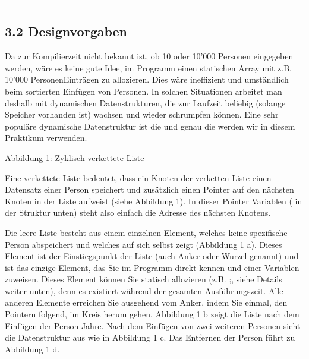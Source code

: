 \documentclass[a4paper,10pt,english]{report}
\begin{document}
\bigskip\hrule\bigskip



\subsection{3.2	Designvorgaben}
\label{\detokenize{P06_Personen_Verwaltung_Linked_List/README:designvorgaben}}
\sphinxAtStartPar
{}
Da zur Kompilierzeit nicht bekannt ist, ob 10 oder 10’000 Personen eingegeben werden, wäre es keine gute Idee, im Programm einen statischen Array mit z.B. 10’000 Personen\sphinxhyphen{}Einträgen zu allozieren. Dies wäre ineffizient und umständlich beim sortierten Einfügen von Personen. In solchen Situationen arbeitet man deshalb mit dynamischen Datenstrukturen, die zur Laufzeit beliebig (solange Speicher vorhanden ist) wachsen und wieder schrumpfen können. Eine sehr populäre dynamische Datenstruktur ist die  und genau die werden wir in diesem Praktikum verwenden.

\sphinxAtStartPar
{}

\sphinxAtStartPar
{}

\sphinxAtStartPar
{}

\sphinxAtStartPar
{}
Abbildung 1: Zyklisch verkettete Liste

\sphinxAtStartPar
Eine verkettete Liste bedeutet, dass ein Knoten der verketten Liste einen Datensatz einer Person speichert und zusätzlich einen Pointer auf den nächsten Knoten in der Liste aufweist (siehe Abbildung 1). In dieser Pointer Variablen ( in der  Struktur unten) steht also einfach die Adresse des nächsten Knotens.

\sphinxAtStartPar
Die leere Liste besteht aus einem einzelnen Element, welches keine spezifische Person abspeichert und welches auf sich selbst zeigt (Abbildung 1 a). Dieses Element ist der Einstiegspunkt der Liste (auch Anker oder Wurzel genannt) und ist das einzige Element, das Sie im Programm direkt kennen und einer Variablen zuweisen. Dieses Element können Sie statisch allozieren (z.B. ;, siehe Details weiter unten), denn es existiert während der gesamten Ausführungszeit. Alle anderen Elemente erreichen Sie ausgehend vom Anker, indem Sie einmal, den Pointern folgend, im Kreis herum gehen. Abbildung 1 b zeigt die Liste nach dem Einfügen der Person  Jahre. Nach dem Einfügen von zwei weiteren Personen sieht die Datenstruktur aus wie in Abbildung 1 c. Das Entfernen der Person  führt zu Abbildung 1 d.
\end{document}
